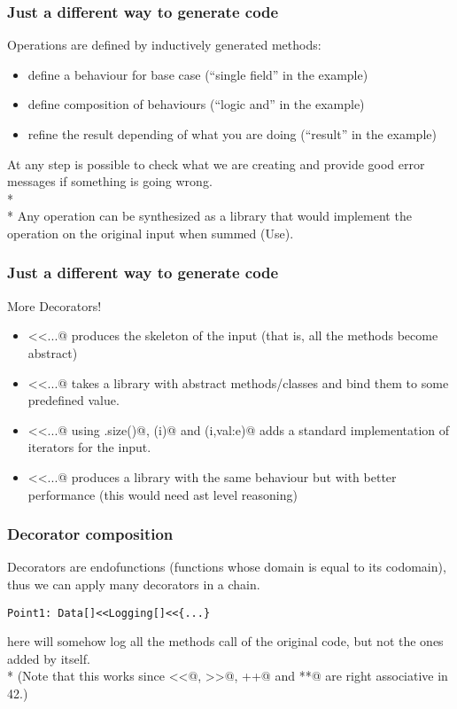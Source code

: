 \begin{frame}[fragile]
\frametitle{Just a different way to generate code}
Operations are defined by inductively generated methods:
\begin{itemize}
\item define a behaviour for base case (``single field'' in the example)
\item define composition of behaviours (``logic and'' in the example)
\item refine the result depending of what you are doing (``result'' in the example) 
\end{itemize}
At any step is possible to check what we are creating and provide good error messages if something is going wrong.\\*${}_{}$\\*
Any operation can be synthesized as a library that would implement the operation on the original input when summed (Use).

\end{frame}


\begin{frame}[fragile]
\frametitle{Just a different way to generate code}
More Decorators! 
\begin{itemize}
\item \Q@Abstract[]<<{...}@ produces the skeleton of the input (that is, all the methods become abstract)
\item \Q@Load[]<<{...}@ takes a library with abstract methods/classes and bind them to some predefined value.
\item \Q@Iterable[]<<{...}@ using \Q@v.size()@, \Q@v(i)@ and \Q@v(i,val:e)@ adds a standard implementation of iterators for the input.
\item \Q@Optimize[]<<{...}@ produces a library with the same behaviour but with better performance (this would need ast level reasoning)

\end{itemize}

\end{frame}




\begin{frame}[fragile]
\frametitle{Decorator composition}
Decorators are 
 endofunctions (functions whose domain is equal to its codomain), thus we can apply many decorators in a chain.
\begin{NiceCode}{59ex}{0.8}
\begin{lstlisting}
Point1: Data[]<<Logging[]<<{...}
\end{lstlisting}
\end{NiceCode}
\Q@Logging@ here will somehow log all the methods call of the original code, but not the ones added by \Q@Data@ itself.\\*
(Note that this works since \Q@<<@, \Q@>>@, \Q@++@ and \Q@**@ are right associative in 42.)
\end{frame}


